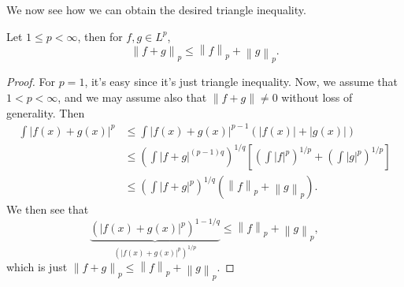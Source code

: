 We now see how we can obtain the desired triangle inequality.
\begin{theorem}\label{thm:Minkowski-inequality}
	Let \(1\leq p < \infty \), then for \(f, g\in L^p\),
	\[
		\left\lVert f + g\right\rVert _p \leq  \left\lVert f\right\rVert _p + \left\lVert g\right\rVert _p.
	\]
\end{theorem}
\begin{proof}
	For \(p = 1\), it's easy since it's just triangle inequality. Now, we assume that \(1 < p < \infty \), and we may assume also that \(\left\lVert f + g\right\rVert \neq 0\) without loss of generality. Then
	\[
		\begin{split}
			\int \left\vert f(x) + g(x) \right\vert ^p &\leq \int \left\vert f(x) + g(x) \right\vert ^{p - 1}\left(\left\vert f(x) \right\vert + \left\vert g(x) \right\vert \right)\\
			&\leq  \left(\int \left\vert f+g \right\vert ^{(p-1)q}\right)^{1 / q}\left[\left(\int \left\vert f \right\vert^p \right)^{1 / p} + \left(\int \left\vert g \right\vert^p \right)^{1 / p}\right]\\
			&\leq  \left(\int \left\vert f + g \right\vert^p \right)^{1 / q}\left(\left\lVert f\right\rVert _p + \left\lVert g\right\rVert _p\right).
		\end{split}
	\]
	We then see that
	\[
		\underbrace{\left(\left\vert f(x) + g(x) \right\vert ^p\right)^{1 - 1 / q}}_{\left(\left\vert f(x) + g(x) \right\vert ^p\right)^{1 / p}} \leq \left\lVert f\right\rVert _p + \left\lVert g\right\rVert_p,
	\]
	which is just \(\left\lVert f + g\right\rVert _{p} \leq \left\lVert f\right\rVert _p + \left\lVert g\right\rVert_p\).
\end{proof}